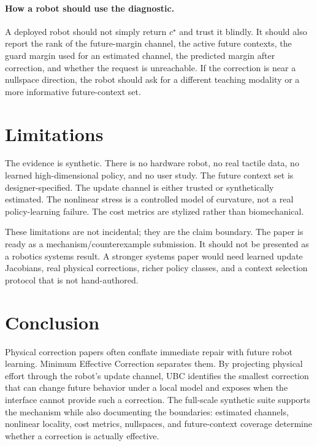 \documentclass{article}
\begin{document}
\paragraph{How a robot should use the diagnostic.}
A deployed robot should not simply return $c^\star$ and trust it blindly. It
should also report the rank of the future-margin channel, the active future
contexts, the guard margin used for an estimated channel, the predicted margin
after correction, and whether the request is unreachable. If the correction is
near a nullspace direction, the robot should ask for a different teaching
modality or a more informative future-context set.

\section{Limitations}

The evidence is synthetic. There is no hardware robot, no real tactile data, no
learned high-dimensional policy, and no user study. The future context set is
designer-specified. The update channel is either trusted or synthetically
estimated. The nonlinear stress is a controlled model of curvature, not a real
policy-learning failure. The cost metrics are stylized rather than biomechanical.

These limitations are not incidental; they are the claim boundary. The paper is
ready as a mechanism/counterexample submission. It should not be presented as a
robotics systems result. A stronger systems paper would need learned update
Jacobians, real physical corrections, richer policy classes, and a context
selection protocol that is not hand-authored.

\section{Conclusion}

Physical correction papers often conflate immediate repair with future robot
learning. Minimum Effective Correction separates them. By projecting physical
effort through the robot's update channel, UBC identifies the smallest
correction that can change future behavior under a local model and exposes when
the interface cannot provide such a correction. The full-scale synthetic suite
supports the mechanism while also documenting the boundaries: estimated
channels, nonlinear locality, cost metrics, nullspaces, and future-context
coverage determine whether a correction is actually effective.
\end{document}
